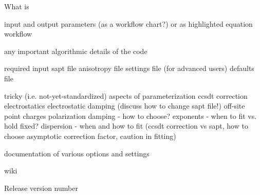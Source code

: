 What is \pointer

input and output parameters (as a workflow chart?)
    or as highlighted equation workflow

any important algorithmic details of the code

required input
    sapt file
    anisotropy file
    settings file
    (for advanced users) defaults file

tricky (i.e. not-yet-standardized) aspects of parameterization
    ccsdt correction
    electrostatics
        electrostatic damping (discuss how to change sapt file!)
        off-site point charges
    polarization damping - how to choose?
    exponents - when to fit vs. hold fixed?
    dispersion - when and how to fit (ccsdt correction vs sapt, how to choose
        asymptotic correction factor, caution in fitting)

documentation of various options and settings

wiki

Release version number
